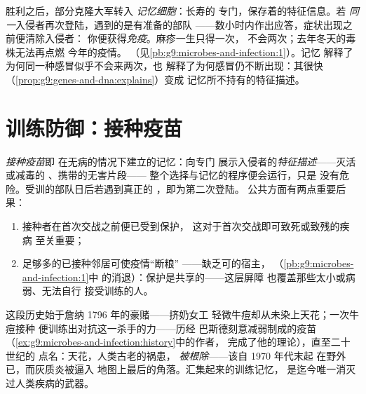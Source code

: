 \begin{definition}[免疫记忆]\label{def:g9:immune-defenses:memory}
胜利之后，部分克隆大军转入
\emph{记忆细胞}：长寿的
专门，保存着的特征信息。若
\emph{同一}入侵者再次登陆，遇到的是有准备的部队
——数小时内作出应答，症状出现之前便清除入侵者：
你便获得\emph{免疫}。麻疹一生只得一次，
不会两次；去年冬天的毒株无法再点燃
今年的疫情。
（见\cref{pb:g9:microbes-and-infection:1}）。记忆
解释了为何同一种感冒似乎不会来两次，也
解释了为何感冒仍不断出现：其很快
（\cref{prop:g9:genes-and-dna:explains}）变成
记忆所不持有的特征描述。
\end{definition}

\section{训练防御：接种疫苗}

\begin{proposition}[接种疫苗]\label{prop:g9:immune-defenses:vaccination}
\emph{接种疫苗}即
在无病的情况下建立的记忆：向专门
展示入侵者的\emph{特征描述}——灭活或减毒的
、携带的无害片段——
整个选择与记忆的程序便会运行，只是
没有危险。受训的部队日后若遇到真正的
，即为第二次登陆。
公共方面有两点重要后果：
\begin{enumerate}
  \item 接种者在首次交战之前便已受到保护，
        这对于首次交战即可致死或致残的疾病
        至关重要；
  \item 足够多的已接种邻居可使疫情“断粮”
——缺乏可的宿主，
        （\cref{pb:g9:microbes-and-infection:1}中
        的消退）：保护是共享的——这层屏障
        也覆盖那些太小或病弱、无法自行
        接受训练的人。
\end{enumerate}
\end{proposition}
\admitted

\begin{example}[从牛痘豪赌到根除天花]\label{ex:g9:immune-defenses:history}
这段历史始于詹纳 1796 年的豪赌——挤奶女工
轻微牛痘却从未染上天花；一次牛痘接种
便训练出对抗这一杀手的力——历经
巴斯德刻意减弱制成的疫苗
（\cref{ex:g9:microbes-and-infection:history}中的作者，
完成了他的理论），直至二十世纪的
点名：天花，人类古老的祸患，
\emph{被根除}——该自 1970 年代末起
在野外已，而灰质炎被逼入
地图上最后的角落。汇集起来的训练记忆，
是迄今唯一消灭过人类疾病的武器。
\end{example}

